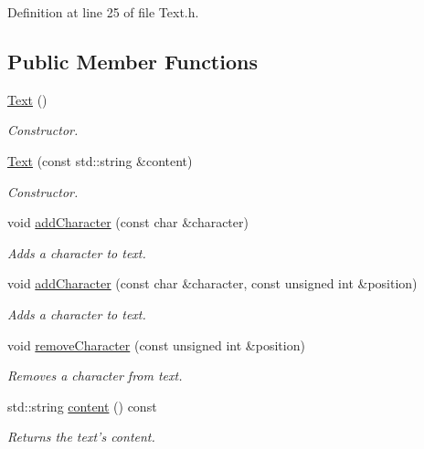 Definition at line 25 of file Text.h.\subsection*{Public Member Functions}
\begin{CompactItemize}
\item 
\hyperlink{class_text_b3e26143fccc52699bcc5149cae852bc}{Text} ()
\begin{CompactList}\small\item\em Constructor. \item\end{CompactList}\item 
\hyperlink{class_text_d8c7b52db022f4351e31b2b7609a8180}{Text} (const std::string \&content)
\begin{CompactList}\small\item\em Constructor. \item\end{CompactList}\item 
void \hyperlink{class_text_6e6da63c90af68639adc7dd1336f6bf9}{addCharacter} (const char \&character)
\begin{CompactList}\small\item\em Adds a character to text. \item\end{CompactList}\item 
void \hyperlink{class_text_fdd11ad0c90ca483d4cff3d74a64da9e}{addCharacter} (const char \&character, const unsigned int \&position)
\begin{CompactList}\small\item\em Adds a character to text. \item\end{CompactList}\item 
void \hyperlink{class_text_e04500eeada2a4a3bb00554b32263c52}{removeCharacter} (const unsigned int \&position)
\begin{CompactList}\small\item\em Removes a character from text. \item\end{CompactList}\item 
std::string \hyperlink{class_text_58a34fa2cfd0c240a7517132017b6a83}{content} () const 
\begin{CompactList}\small\item\em Returns the text's content. \item\end{CompactList}\item 

\end{CompactItemize}
